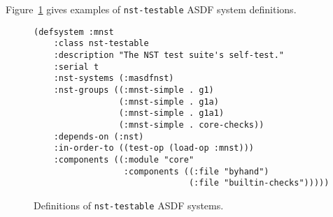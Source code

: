 Figure~\ref{fig:asdf} gives examples of \texttt{nst-testable} ASDF
system definitions.
\begin{figure}
\begin{verbatim}
(defsystem :mnst
    :class nst-testable
    :description "The NST test suite's self-test."
    :serial t
    :nst-systems (:masdfnst)
    :nst-groups ((:mnst-simple . g1)
                 (:mnst-simple . g1a)
                 (:mnst-simple . g1a1)
                 (:mnst-simple . core-checks))
    :depends-on (:nst)
    :in-order-to ((test-op (load-op :mnst)))
    :components ((:module "core"
                  :components ((:file "byhand")
                               (:file "builtin-checks")))))
\end{verbatim}
\caption{Definitions of \texttt{nst-testable} ASDF systems.}
\label{fig:asdf}
\end{figure}

